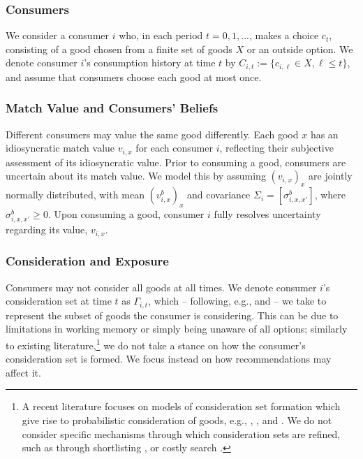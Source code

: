 \documentclass[12pt]{article}
\theoremstyle{newtheorem}
\begin{document}
\subsubsection{Consumers}
We consider a consumer $i$ who, in each period $t=0,1,...$, makes a choice $c_t$, consisting of a good chosen from a finite set of goods $X$ or an outside option. 
We denote consumer $i$'s consumption history at time $t$ by $C_{i,t}:=\{c_{i,\ell} \in X, \ell \leq t\}$, and assume that consumers choose each good at most once. 


\subsubsection{Match Value and Consumers' Beliefs}
Different consumers may value the same good differently. 
Each good $x$ has an idiosyncratic match value $v_{i,x}$ for each consumer $i$, reflecting their subjective assessment of its idiosyncratic value.
Prior to consuming a good, consumers are uncertain about its match value. 
We model this by assuming ${(v_{i,x})}_x$ are jointly normally distributed, with mean ${(v_{i,x}^b)}_x$ and covariance $\Sigma_i=[\sigma_{i,x,x'}^b]$, where $\sigma_{i,x,x'}^b\geq 0$. 
Upon consuming a good, consumer $i$ fully resolves uncertainty regarding its value, $v_{i,x}$.


\subsubsection{Consideration and Exposure}
Consumers may not consider all goods at all times.
We denote consumer $i$'s consideration set at time $t$ as $\Gamma_{i,t}$, which -- following, e.g., \citet{Goeree2008Ecta} and \citet{MasatliogluNakajimaOzbay2012AER} -- we take to represent the subset of goods the consumer is considering.
This can be due to limitations in working memory or simply being unaware of all options; similarly to existing literature,\footnote{
    A recent literature focuses on models of consideration set formation which give rise to probabilistic consideration of goods, e.g., \citet{CaplinDeanLeahy2019REStud}, \citet{CattaneoMaMasatliogluSuleymanov2020JPE}, and \citet{AbaluckAdams2021QJE}.
    We do not consider specific mechanisms through which consideration sets are refined, such as through shortlisting \citep{ManziniMariotti2014Ecta}, or costly search \citep{HonkaHortacsuVitorino2017RAND}.
} we do not take a stance on how the consumer's consideration set is formed. 
We focus instead on how recommendations may affect it.
 
\end{document}
